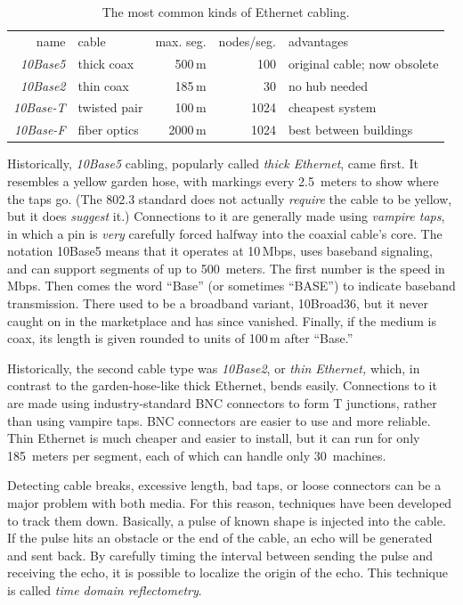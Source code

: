 \begin{table}
   \centering
   \begin{tabular}{rlrrl}
   name              & cable         & max. seg. & nodes/seg. & advantages                   \\[1ex]
   \textit{10Base5}  & thick coax    &    500\,m &        100 & original cable; now obsolete \\
   \textit{10Base2}  & thin coax     &    185\,m &         30 & no hub needed                \\
   \textit{10Base-T} & twisted pair  &    100\,m &       1024 & cheapest system              \\
   \textit{10Base-F} & fiber optics  &   2000\,m &       1024 & best between buildings       \\
   \end{tabular}
   \caption{The most common kinds of Ethernet cabling.}
   \label{fig:common-ethernet-cabling}
\end{table}


Historically, \emph{10Base5} cabling, popularly called \emph{thick Ethernet}, came first.
It resembles a yellow garden hose, with markings every 2.5~meters to show where the taps go.
(The 802.3 standard does not actually \emph{require} the cable to be yellow, but it does \emph{suggest} it.)
Connections to it are generally made using \emph{vampire taps}, in which a pin is \emph{very} carefully forced halfway into the coaxial cable's core.
The notation 10Base5 means that it operates at 10\,Mbps, uses baseband signaling, and can support segments of up to 500~meters.
The first number is the speed
in Mbps. Then comes the word ``Base'' (or sometimes ``BASE'') to
indicate baseband transmission. There used to be a broadband variant,
10Broad36, but it never caught on in the marketplace and has since
vanished. Finally, if the medium is coax, its length is given rounded to
units of 100\,m after ``Base.''

Historically, the second cable type was \emph{10Base2}, or \emph{thin Ethernet,}
which, in contrast to the garden-hose-like thick Ethernet, bends easily.
Connections to it are made using industry-standard BNC connectors to
form T junctions, rather than using vampire taps. BNC connectors are
easier to use and more reliable. Thin Ethernet is much cheaper and
easier to install, but it can run for only 185~meters per segment, each of which can handle only 30~machines.

Detecting cable breaks, excessive length, bad taps, or loose connectors
can be a major problem with both media. For this reason, techniques have
been developed to track them down. Basically, a pulse of known shape is
injected into the cable. If the pulse hits an obstacle or the end of the
cable, an echo will be generated and sent back. By carefully timing the
interval between sending the pulse and receiving the echo, it is
possible to localize the origin of the echo. This technique is called
\emph{time domain reflectometry}.

